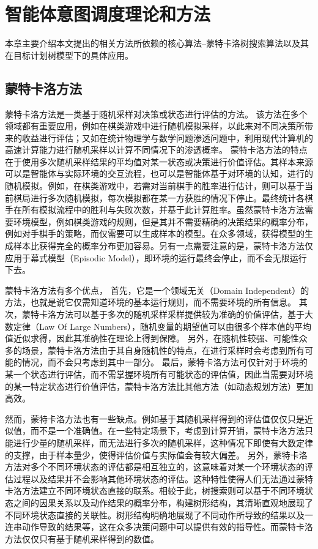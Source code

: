 \section{智能体意图调度理论和方法}
本章主要介绍本文提出的相关方法所依赖的核心算法--蒙特卡洛树搜索算法以及其在目标计划树模型下的具体应用。
\subsection{蒙特卡洛方法}
蒙特卡洛方法是一类基于随机采样对决策或状态进行评估的方法。
该方法在多个领域都有重要应用，例如在棋类游戏中进行随机模拟采样，以此来对不同决策所带来的收益进行评估；又如在统计物理学与数学问题渗透问题中，利用现代计算机的高速计算能力进行随机采样以计算不同情况下的渗透概率。
蒙特卡洛方法的特点在于使用多次随机采样结果的平均值对某一状态或决策进行价值评估。其样本来源可以是智能体与实际环境的交互流程，也可以是智能体基于对环境的认知，进行的随机模拟。例如，在棋类游戏中，若需对当前棋手的胜率进行估计，则可以基于当前棋局进行多次随机模拟，每次模拟都在某一方获胜的情况下停止。最终统计各棋手在所有模拟流程中的胜利与失败次数，并基于此计算胜率。虽然蒙特卡洛方法需要环境模型，例如棋类游戏的规则，但是其并不需要精确的决策结果的概率分布，例如对手棋手的策略，而仅需要可以生成样本的模型。在众多领域，获得模型的生成样本比获得完全的概率分布更加容易。另有一点需要注意的是，蒙特卡洛方法仅应用于幕式模型（Episodic Model），即环境的运行最终会停止，而不会无限运行下去。

蒙特卡洛方法有多个优点，
首先，它是一个领域无关（Domain Independent）的方法，也就是说它仅需知道环境的基本运行规则，而不需要环境的所有信息。
%
其次，蒙特卡洛方法可以基于多次的随机采样采样提供较为准确的价值评估，基于大数定律（Law Of Large Numbers），随机变量的期望值可以由很多个样本值的平均值近似求得，因此其准确性在理论上得到保障。
%
另外，在随机性较强、可能性众多的场景，蒙特卡洛方法由于其自身随机性的特点，在进行采样时会考虑到所有可能的情况，而不会只考虑到其中一部分。
%
最后，蒙特卡洛方法可仅针对于环境的某一个状态进行评估，而不需掌握环境所有可能状态的评估值，因此当需要对环境的某一特定状态进行价值评估，蒙特卡洛方法比其他方法（如动态规划方法）更加高效。

然而，蒙特卡洛方法也有一些缺点。例如基于其随机采样得到的评估值仅仅只是近似值，而不是一个准确值。在一些特定场景下，考虑到计算开销，蒙特卡洛方法只能进行少量的随机采样，而无法进行多次的随机采样，这种情况下即使有大数定律的支撑，由于样本量少，使得评估价值与实际值会有较大偏差。
%
另外，蒙特卡洛方法对多个不同环境状态的评估都是相互独立的，这意味着对某一个环境状态的评估过程以及结果并不会影响其他环境状态的评估。这种特性使得人们无法通过蒙特卡洛方法建立不同环境状态直接的联系。相较于此，树搜索则可以基于不同环境状态之间的因果关系以及动作结果的概率分布，构建树形结构，其清晰直观地展现了不同环境状态直接的关联性。树形结构明确地展现了不同动作所导致的结果以及一连串动作导致的结果等，这在众多决策问题中可以提供有效的指导性。而蒙特卡洛方法仅仅只有基于随机采样得到的数值。
